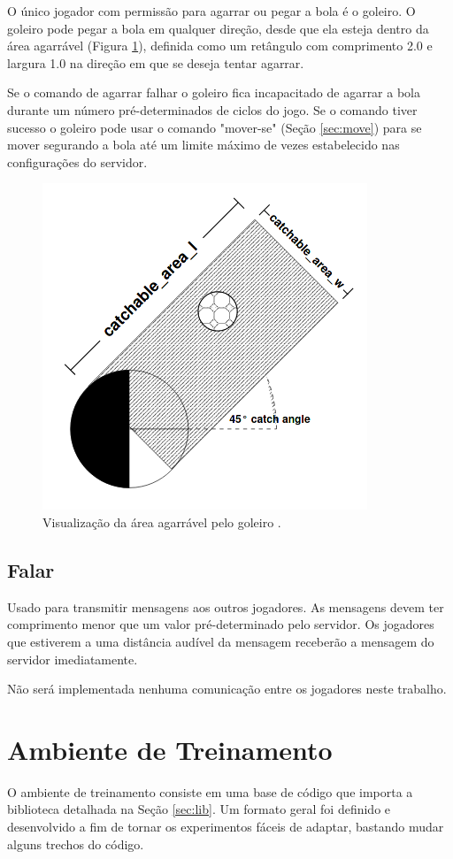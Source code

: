O único jogador com permissão para agarrar ou pegar a bola é o goleiro. O goleiro pode pegar a bola em qualquer direção, desde que ela esteja dentro da área agarrável (Figura \ref{fig:catch}), definida como um retângulo com comprimento 2.0 e largura 1.0 na direção em que se deseja tentar agarrar.

Se o comando de agarrar falhar o goleiro fica incapacitado de agarrar a bola durante um número pré-determinados de ciclos do jogo. Se o comando tiver sucesso o goleiro pode usar o comando "mover-se" (Seção \ref{sec:move}) para se mover segurando a bola até um limite máximo de vezes estabelecido nas configurações do servidor.

\begin{figure}[H]
	\includegraphics[width=0.5\linewidth]{figs/catch.png}
	\centering
	\caption{Visualização da área agarrável pelo goleiro \cite{rcssmanual2003}.}
	\label{fig:catch}
\end{figure}

\subsection{Falar}

Usado para transmitir mensagens aos outros jogadores. As mensagens devem ter comprimento menor que um valor pré-determinado pelo servidor. Os jogadores que estiverem a uma distância audível da mensagem receberão a mensagem do servidor imediatamente.

Não será implementada nenhuma comunicação entre os jogadores neste trabalho.


\section{Ambiente de Treinamento}

O ambiente de treinamento consiste em uma base de código que importa a biblioteca detalhada na Seção \ref{sec:lib}. Um formato geral foi definido e desenvolvido a fim de tornar os experimentos fáceis de adaptar, bastando mudar alguns trechos do código.

